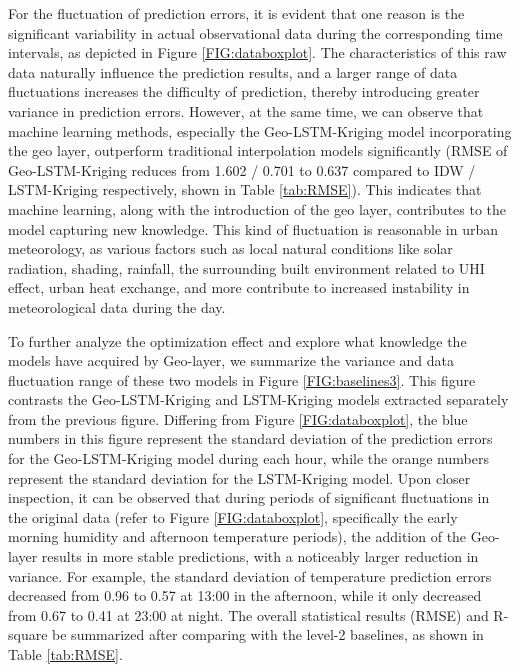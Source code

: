 \documentclass[a4paper,fleqn]{cas-sc}
\begin{document}
For the fluctuation of prediction errors, it is evident that one reason is the significant variability in actual observational data during the corresponding time intervals, as depicted in Figure \ref{FIG:databoxplot}. The characteristics of this raw data naturally influence the prediction results, and a larger range of data fluctuations increases the difficulty of prediction, thereby introducing greater variance in prediction errors. However, at the same time, we can observe that machine learning methods, especially the Geo-LSTM-Kriging model incorporating the geo layer, outperform traditional interpolation models significantly (RMSE of Geo-LSTM-Kriging reduces from 1.602 / 0.701 to 0.637 compared to IDW / LSTM-Kriging respectively, shown in Table \ref{tab:RMSE}). This indicates that machine learning, along with the introduction of the geo layer, contributes to the model capturing new knowledge. This kind of fluctuation is reasonable in urban meteorology, as various factors such as local natural conditions like solar radiation, shading, rainfall, the surrounding built environment related to UHI effect, urban heat exchange, and more contribute to increased instability in meteorological data during the day. 

To further analyze the optimization effect and explore what knowledge the models have acquired by Geo-layer, we summarize the variance and data fluctuation range of these two models in Figure \ref{FIG:baselines3}. This figure contrasts the Geo-LSTM-Kriging and LSTM-Kriging models extracted separately from the previous figure. Differing from Figure \ref{FIG:databoxplot}, the blue numbers in this figure represent the standard deviation of the prediction errors for the Geo-LSTM-Kriging model during each hour, while the orange numbers represent the standard deviation for the LSTM-Kriging model. Upon closer inspection, it can be observed that during periods of significant fluctuations in the original data (refer to Figure \ref{FIG:databoxplot}, specifically the early morning humidity and afternoon temperature periods), the addition of the Geo-layer results in more stable predictions, with a noticeably larger reduction in variance. For example, the standard deviation of temperature prediction errors decreased from 0.96 to 0.57 at 13:00 in the afternoon, while it only decreased from 0.67 to 0.41 at 23:00 at night. The overall statistical results (RMSE) and R-square be summarized after comparing with the level-2 baselines, as shown in Table \ref{tab:RMSE}. 
\end{document}
